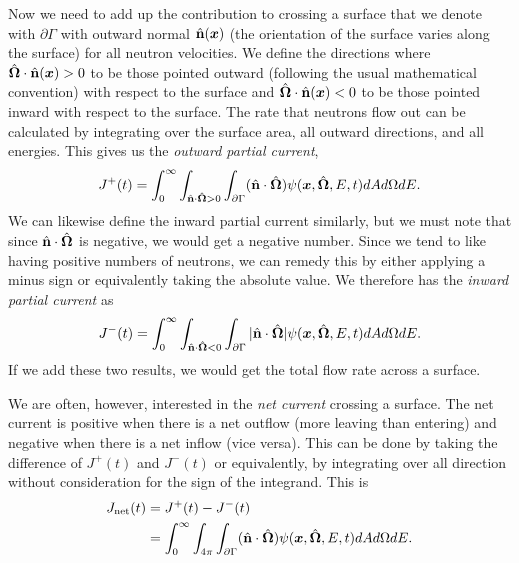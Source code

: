 Now we need to add up the contribution to crossing a surface that we denote with $\partial \Gamma$ with outward normal $\hat{\mathbf{n}}(\bm{x})$ (the orientation of the surface varies along the surface) for all neutron velocities. We define the directions where $\hat{\mathbf{\Omega}} \cdot \hat{\mathbf{n}}(\bm{x}) > 0$ to be those pointed outward (following the usual mathematical convention) with respect to the surface and $\hat{\mathbf{\Omega}} \cdot \hat{\mathbf{n}}(\bm{x}) < 0$ to be those pointed inward with respect to the surface. The rate that neutrons flow out can be calculated by integrating over the surface area, all outward directions, and all energies. This gives us the \emph{outward partial current},
\begin{align}
  J^+(t) = \int_0^\infty \int_{\hat{\mathbf{n}} \cdot \hat{\mathbf{\Omega}} > 0} \int_{\partial \Gamma} (\hat{\mathbf{n}} \cdot \hat{\mathbf{\Omega}})  \psi (\bm{x},\hat{\mathbf{\Omega}},E,t) dA d\Omega dE .
\end{align}
We can likewise define the inward partial current similarly, but we must note that since $\hat{\mathbf{n}} \cdot \hat{\mathbf{\Omega}}$ is negative, we would get a negative number. Since we tend to like having positive numbers of neutrons, we can remedy this by either applying a minus sign or equivalently taking the absolute value. We therefore has the \emph{inward partial current} as
\begin{align}
  J^-(t) = \int_0^\infty \int_{\hat{\mathbf{n}} \cdot \hat{\mathbf{\Omega}} < 0} \int_{\partial \Gamma} | \hat{\mathbf{n}} \cdot \hat{\mathbf{\Omega}} |  \psi (\bm{x},\hat{\mathbf{\Omega}},E,t) dA d\Omega dE .
\end{align}
If we add these two results, we would get the total flow rate across a surface.

We are often, however, interested in the \emph{net current} crossing a surface. The net current is positive when there is a net outflow (more leaving than entering) and negative when there is a net inflow (vice versa). This can be done by taking the difference of $J^+(t)$ and $J^-(t)$ or equivalently, by integrating over all direction without consideration for the sign of the integrand. This is
\begin{align}
  J_\textrm{net}(t) 
  &= J^+(t) - J^-(t) \nonumber \\
  &=\int_0^\infty \int_{4\pi} \int_{\partial \Gamma} (\hat{\mathbf{n}} \cdot \hat{\mathbf{\Omega}})  \psi (\bm{x},\hat{\mathbf{\Omega}},E,t) dA d\Omega dE .
\end{align}

